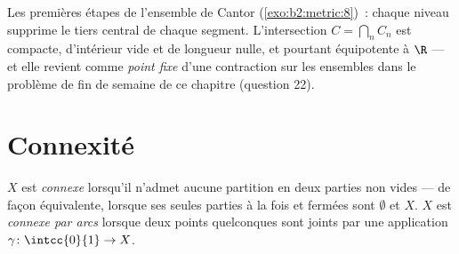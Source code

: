 \begin{omfigure}

{\small Les premières étapes de l'ensemble de Cantor
(\cref{exo:b2:metric:8})~: chaque niveau supprime le tiers central
 de chaque segment. L'intersection $C = \bigcap_n C_n$ est
compacte, d'intérieur vide et de longueur nulle, et pourtant
équipotente à $\R$ --- et elle revient comme \emph{point fixe} d'une
contraction sur les ensembles dans le problème de fin de semaine de
ce chapitre (question 22).}
\end{omfigure}

\section{Connexité}

\begin{definition}\label{def:b2:metric:connected}
$X$ est \emph{connexe} lorsqu'il n'admet aucune
partition en deux parties  non vides --- de façon
équivalente, lorsque ses seules parties à la fois  et fermées
sont $\emptyset$ et $X$. $X$ est \emph{connexe par arcs} lorsque deux
points quelconques sont joints par une application  $\gamma
\colon \intcc{0}{1} \to X$.
\end{definition}

